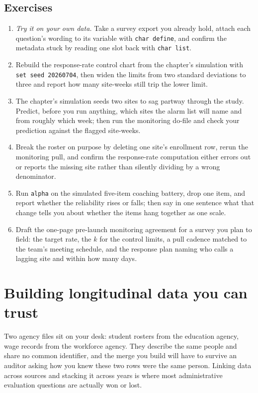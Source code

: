 \documentclass[
    a4paper,
    fontsize=10pt,
    twoside=true,
    numbers=noenddot,
]{kaobook}
\begin{document}
\section*{Exercises}
\begin{enumerate}
\item \emph{Try it on your own data.} Take a survey export you already hold, attach each question's wording to its variable with \texttt{char define}, and confirm the metadata stuck by reading one slot back with \texttt{char list}.
\item Rebuild the response-rate control chart from the chapter's simulation with \texttt{set seed 20260704}, then widen the limits from two standard deviations to three and report how many site-weeks still trip the lower limit.
\item The chapter's simulation seeds two sites to sag partway through the study. Predict, before you run anything, which sites the alarm list will name and from roughly which week; then run the monitoring do-file and check your prediction against the flagged site-weeks.
\item Break the roster on purpose by deleting one site's enrollment row, rerun the monitoring pull, and confirm the response-rate computation either errors out or reports the missing site rather than silently dividing by a wrong denominator.
\item Run \texttt{alpha} on the simulated five-item coaching battery, drop one item, and report whether the reliability rises or falls; then say in one sentence what that change tells you about whether the items hang together as one scale.
\item Draft the one-page pre-launch monitoring agreement for a survey you plan to field: the target rate, the $k$ for the control limits, a pull cadence matched to the team's meeting schedule, and the response plan naming who calls a lagging site and within how many days.
\end{enumerate}
\chapter{Building longitudinal data you can trust}\label{ch:panels}

Two agency files sit on your desk: student rosters from the education agency, wage records from the workforce agency. They describe the same people and share no common identifier, and the merge you build will have to survive an auditor asking how you knew these two rows were the same person. Linking data across sources and stacking it across years is where most administrative evaluation questions are actually won or lost.
\end{document}
